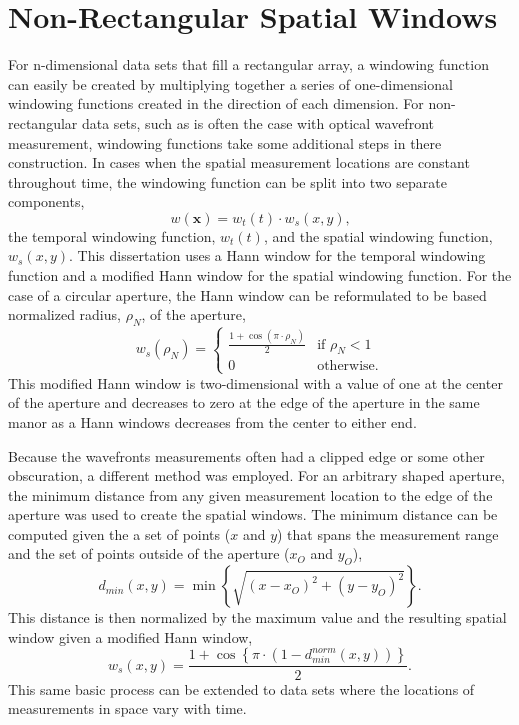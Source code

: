 \section{Non-Rectangular Spatial Windows}
For n-dimensional data sets that fill a rectangular array, a windowing function can easily be created by multiplying together a series of one-dimensional windowing functions created in the direction of each dimension.
For non-rectangular data sets, such as is often the case with optical wavefront measurement, windowing functions take some additional steps in there construction.
In cases when the spatial measurement locations are constant throughout time, the windowing function can be split into two separate components,
\begin{equation}
 w(\mathbf{x}) = w_t(t)\cdot w_s(x,y) \textrm{,}
 \label{eqn:04_window_sep}
\end{equation}
the temporal windowing function, $w_t(t)$, and the spatial windowing function, $w_s(x,y)$.
This dissertation uses a Hann window for the temporal windowing function and a modified Hann window for the spatial windowing function.
For the case of a circular aperture, the Hann window can be reformulated to be based normalized radius, $\rho_N$, of the aperture,
\begin{equation}
 w_s(\rho_N) =
 \begin{cases}
  \frac{1+\cos(\pi\cdot\rho_N)}{2} & \textrm{if } \rho_N < 1 \\
  0                                & \textrm{otherwise.}
 \end{cases}
 \label{eqn:04_window_space}
\end{equation}
This modified Hann window is two-dimensional with a value of one at the center of the aperture and decreases to zero at the edge of the aperture in the same manor as a Hann windows decreases from the center to either end.

Because the wavefronts measurements often had a clipped edge or some other obscuration, a different method was employed.
For an arbitrary shaped aperture, the minimum distance from any given measurement location to the edge of the aperture was used to create the spatial windows.
The minimum distance can be computed given the a set of points ($x$ and $y$) that spans the measurement range and the set of points outside of the aperture ($x_O$ and $y_O$),
\begin{equation}
 d_{min}(x,y) = \min\left\{\sqrt{(x-x_{O})^2+(y-y_{O})^2}\right\} \textrm{.}
 \label{eqn:04_window_space_arb_dist}
\end{equation}
This distance is then normalized by the maximum value and the resulting spatial window given a modified Hann window,
\begin{equation}
 w_s(x,y) = \frac{1+\cos\left\{\pi\cdot\left(1-d_{min}^{norm}(x,y)\right)\right\}}{2} \textrm{.}
 \label{eqn:04_window_space_arb}
\end{equation}
This same basic process can be extended to data sets where the locations of measurements in space vary with time.


